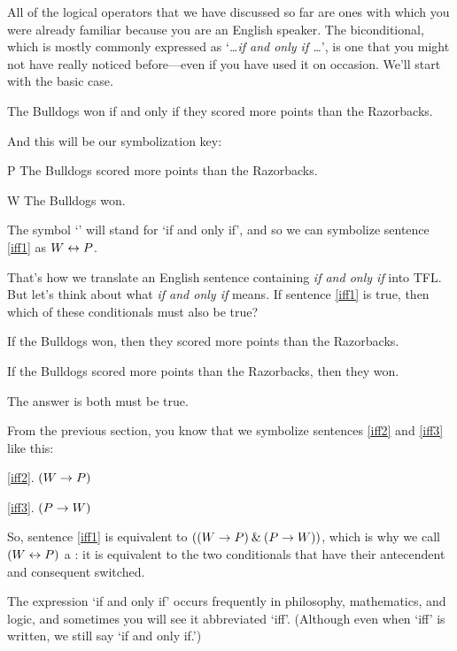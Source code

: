 All of the logical operators that we have discussed so far are ones with which you were already familiar because you are an English speaker. The biconditional, which is mostly commonly expressed as `\textit{\ldots if and only if \ldots}', is one that you might not have really noticed before---even if you have used it on occasion. We'll start with the basic case.
	\begin{earg}
		\item[\ex{iff1}] The Bulldogs won if and only if they scored more points than the Razorbacks.
	\end{earg}
And this will be our symbolization key:
	\begin{ekey}
		\item[P] The Bulldogs scored more points than the Razorbacks.
		\item[W] The Bulldogs won.
	\end{ekey}
The symbol `\eiff' will stand for `if and only if', and so we can symbolize sentence \ref{iff1} as $W \leftrightarrow P$.

That's how we translate an English sentence containing \textit{if and only if} into TFL. But let's think about what \textit{if and only if} means. If sentence \ref{iff1} is true, then which of these conditionals must also be true?
	\begin{earg}
		\item[\ex{iff2}] If the Bulldogs won, then they scored more points than the Razorbacks.
		\item[\ex{iff3}] If the Bulldogs scored more points than the Razorbacks, then they won.
	\end{earg}
The answer is both must be true.
	
From the previous section, you know that we symbolize sentences \ref{iff2} and \ref{iff3} like this:
	\begin{earg}
		\item[\ref{iff2}.] $(W \rightarrow P)$
		\item[\ref{iff3}.] $(P \rightarrow W)$ 
	\end{earg}
So, sentence \ref{iff1} is equivalent to $((W \rightarrow P) \mathbin{\&} (P \rightarrow W))$, which is why we call $(W \leftrightarrow P)$ a : it is equivalent to the two conditionals that have their antecendent and consequent switched.

The expression `if and only if' occurs frequently in philosophy, mathematics, and logic, and sometimes you will see it abbreviated `iff'. (Although even when `iff' is written, we still say `if and only if.') 

